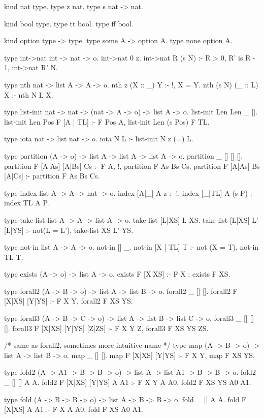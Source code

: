 \begin{elpicode}
kind nat type.
type z nat.
type s nat -> nat.

kind bool type.
type tt bool.
type ff bool.

kind option type -> type.
type some A -> option A.
type none option A.

type int->nat int -> nat -> o.
int->nat 0 z.
int->nat R (s N) :- R > 0, R' is R - 1, int->nat R' N.

type nth nat -> list A -> A -> o.
nth z (X :: _) Y  :- !, X = Y.
nth (s N) (_ :: L) X :- nth N L X.

type list-init nat -> nat -> (nat -> A -> o) -> list A -> o.
list-init Len Len _ [].
list-init Len Pos F [A | TL] :- F Pos A, list-init Len (s Pos) F TL.

type iota nat -> list nat -> o.
iota N L :- list-init N z (=) L.

type partition (A -> o) -> list A -> list A -> list A -> o.
partition _ [] [] [].
partition F [A|As] [A|Bs] Cs :- F A, !, partition F As Bs Cs.
partition F [A|As] Bs [A|Cs] :- partition F As Bs Cs.

type index list A -> A -> nat -> o.
index [A|_] A z :- !.
index [_|TL] A (s P) :- index TL A P.

type take-list list A -> A -> list A -> o.
take-list [L|XS] L XS.
take-list [L|XS] L' [L|YS] :- not(L = L'), take-list XS L' YS.

type not-in list A -> A -> o.
not-in [] _.
not-in [X | TL] T :- not (X = T), not-in TL T.

type exists (A -> o) -> list A -> o.
exists F [X|XS] :- F X ; exists F XS.

type forall2 (A -> B -> o) -> list A -> list B -> o.
forall2 _ [] [].
forall2 F [X|XS] [Y|YS] :- F X Y, forall2 F XS YS.

type forall3 (A -> B -> C -> o) -> list A -> list B -> list C -> o.
forall3 _ [] [] [].
forall3 F [X|XS] [Y|YS] [Z|ZS] :- F X Y Z, forall3 F XS YS ZS.

/* same as forall2, sometimes more intuitive name */
type map (A -> B -> o) -> list A -> list B -> o.
map _ [] [].
map F [X|XS] [Y|YS] :- F X Y, map F XS YS.

type fold2 (A -> A1 -> B -> B -> o) -> list A -> list A1 -> B -> B -> o.
fold2 _ [] [] A A.
fold2 F [X|XS] [Y|YS] A A1 :- F X Y A A0, fold2 F XS YS A0 A1.

type fold (A -> B -> B -> o) -> list A -> B -> B -> o.
fold _ [] A A.
fold F [X|XS] A A1 :- F X A A0, fold F XS A0 A1.


\end{elpicode}
